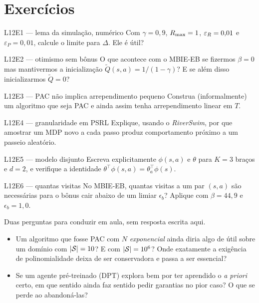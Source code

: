 \documentclass[11pt, a4paper]{article}
\newcommand{\Qtil}{\widetilde{Q}}
\newcommand{\feat}{\phi}
\begin{document}
\section{Exercícios}

\begin{exbox}{L12E1 --- lema da simulação, numérico}
Com $\gamma = 0{,}9$, $R_{\max} = 1$, $\varepsilon_{R} = 0{,}01$ e
$\varepsilon_P = 0{,}01$, calcule o limite para $\Delta$. Ele é útil?
\end{exbox}

\begin{exbox}{L12E2 --- otimismo sem bônus}
O que acontece com o MBIE-EB se fizermos $\beta = 0$ mas mantivermos a inicialização
$\Qtil(s,a) = 1/(1-\gamma)$? E se além disso inicializarmos $\Qtil = 0$?
\end{exbox}

\begin{exbox}{L12E3 --- PAC não implica arrependimento pequeno}
Construa (informalmente) um algoritmo que seja PAC e ainda assim tenha arrependimento
linear em $T$.
\end{exbox}

\begin{exbox}{L12E4 --- granularidade em PSRL}
Explique, usando o \textit{RiverSwim}, por que amostrar um MDP novo a cada passo produz
comportamento próximo a um passeio aleatório.
\end{exbox}

\begin{exbox}{L12E5 --- modelo disjunto}
Escreva explicitamente $\feat(s,a)$ e $\theta$ para $K = 3$ braços e $d = 2$, e verifique
a identidade $\theta^{\!\top}\feat(s,a) = \theta_a^{\!\top}\feat(s)$.
\end{exbox}

\begin{exbox}{L12E6 --- quantas visitas}
No MBIE-EB, quantas visitas a um par $(s,a)$ são necessárias para o bônus cair abaixo de
um limiar $\epsilon_b$? Aplique com $\beta = 44{,}9$ e $\epsilon_b = 1{,}0$.
\end{exbox}

\begin{discbox}
Duas perguntas para conduzir em aula, sem resposta escrita aqui.
\begin{itemize}
  \item Um algoritmo que fosse PAC com $N$ \emph{exponencial} ainda diria algo de útil
        sobre um domínio com $\lvert\mathcal{S}\rvert = 10$? E com $\lvert\mathcal{S}\rvert = 10^{6}$? Onde exatamente
        a exigência de polinomialidade deixa de ser conservadora e passa a ser essencial?
  \item Se um agente pré-treinado (DPT) explora bem por ter aprendido o \textit{a priori}
        certo, em que sentido ainda faz sentido pedir garantias no pior caso? O que se
        perde ao abandoná-las?
\end{itemize}
\end{discbox}
\end{document}
